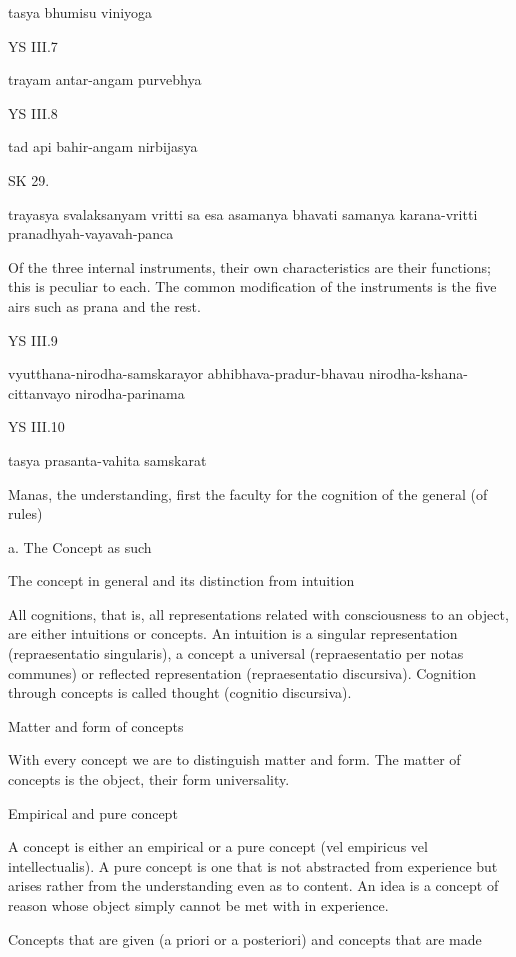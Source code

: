     tasya bhumisu viniyoga

YS III.7

    trayam antar-angam purvebhya

YS III.8

    tad api bahir-angam nirbijasya

SK 29.

trayasya svalaksanyam vritti sa esa asamanya bhavati
samanya karana-vritti pranadhyah-vayavah-panca

Of the three internal instruments, their own characteristics are their functions;
this is peculiar to each.
The common modification of the instruments is the five airs
such as prana and the rest.

YS III.9

    vyutthana-nirodha-samskarayor abhibhava-pradur-bhavau nirodha-kshana-cittanvayo nirodha-parinama

YS III.10

    tasya prasanta-vahita samskarat

    Manas, the understanding, first the faculty for the cognition of the general (of rules)

    a. The Concept as such

    The concept in general and its distinction from intuition

        All cognitions, that is, all representations related with consciousness to an object,
        are either intuitions or concepts.
        An intuition is a singular representation (repraesentatio singularis),
        a concept a universal (repraesentatio per notas communes) or
        reflected representation (repraesentatio discursiva).
        Cognition through concepts is called thought (cognitio discursiva).

    Matter and form of concepts

        With every concept we are to distinguish matter and form.
        The matter of concepts is the object, their form universality.

    Empirical and pure concept

        A concept is either an empirical or a pure concept
        (vel empiricus vel intellectualis).
        A pure concept is one that is not abstracted from experience but
        arises rather from the understanding even as to content.
        An idea is a concept of reason whose object simply cannot be met with in experience.

    Concepts that are given (a priori or a posteriori) and concepts that are made

